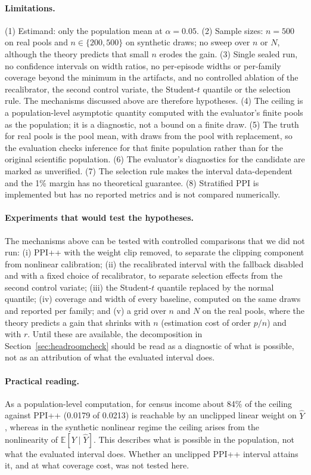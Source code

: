 \documentclass{article}
\newcommand{\Yhat}{\hat Y}
\newcommand{\E}{\mathbb{E}}
\begin{document}
\paragraph{Limitations.} (1) Estimand: only the population mean at $\alpha=0.05$. (2) Sample sizes: $n=500$ on real pools and $n\in\{200,500\}$ on synthetic draws; no sweep over $n$ or $N$, although the theory predicts that small $n$ erodes the gain. (3) Single sealed run, no confidence intervals on width ratios, no per-episode widths or per-family coverage beyond the minimum in the artifacts, and no controlled ablation of the recalibrator, the second control variate, the Student-$t$ quantile or the selection rule. The mechanisms discussed above are therefore hypotheses. (4) The ceiling is a population-level asymptotic quantity computed with the evaluator's finite pools as the population; it is a diagnostic, not a bound on a finite draw. (5) The truth for real pools is the pool mean, with draws from the pool with replacement, so the evaluation checks inference for that finite population rather than for the original scientific population. (6) The evaluator's diagnostics for the candidate are marked as unverified. (7) The selection rule makes the interval data-dependent and the 1\% margin has no theoretical guarantee. (8) Stratified PPI is implemented but has no reported metrics and is not compared numerically.

\paragraph{Experiments that would test the hypotheses.} The mechanisms above can be tested with controlled comparisons that we did not run: (i) PPI++ with the weight clip removed, to separate the clipping component from nonlinear calibration; (ii) the recalibrated interval with the fallback disabled and with a fixed choice of recalibrator, to separate selection effects from the second control variate; (iii) the Student-$t$ quantile replaced by the normal quantile; (iv) coverage and width of every baseline, computed on the same draws and reported per family; and (v) a grid over $n$ and $N$ on the real pools, where the theory predicts a gain that shrinks with $n$ (estimation cost of order $p/n$) and with $r$. Until these are available, the decomposition in Section~\ref{sec:headroomcheck} should be read as a diagnostic of what is possible, not as an attribution of what the evaluated interval does.

\paragraph{Practical reading.} As a population-level computation, for census income about 84\% of the ceiling against PPI++ (0.0179 of 0.0213) is reachable by an unclipped linear weight on $\Yhat$, whereas in the synthetic nonlinear regime the ceiling arises from the nonlinearity of $\E[Y\mid\Yhat]$. This describes what is possible in the population, not what the evaluated interval does. Whether an unclipped PPI++ interval attains it, and at what coverage cost, was not tested here.
\end{document}
